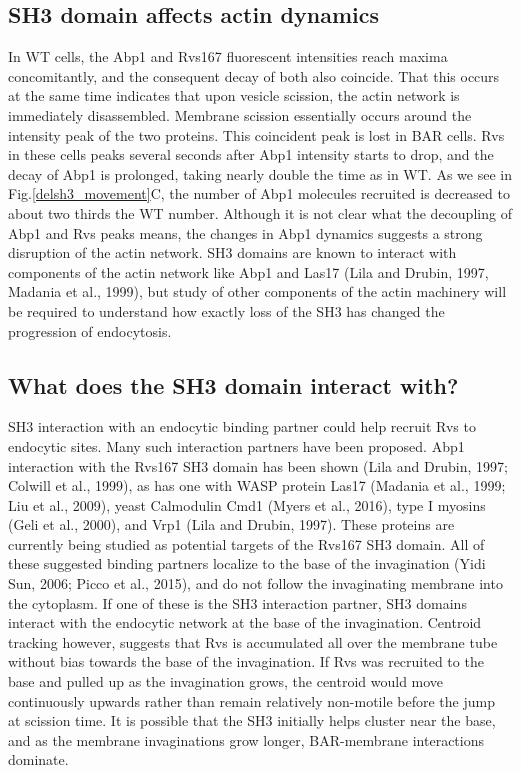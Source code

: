 \subsection{SH3 domain affects actin dynamics}
In WT cells, the Abp1 and Rvs167 fluorescent intensities reach maxima concomitantly, and the consequent decay of both also coincide. That this occurs at the same time indicates that upon vesicle scission, the actin network is immediately disassembled. Membrane scission essentially occurs around the intensity peak of the two proteins. This coincident peak is lost in BAR cells. Rvs in these cells peaks several seconds after Abp1 intensity starts to drop, and the decay of Abp1 is prolonged, taking nearly double the time as in WT. As we see in Fig.\ref{delsh3_movement}C, the number of Abp1 molecules recruited is decreased to about two thirds the WT number. Although it is not clear what the decoupling of Abp1 and Rvs peaks means, the changes in Abp1 dynamics suggests a strong disruption of the actin network. SH3 domains are known to interact with components of the actin network like Abp1 and Las17 (Lila and Drubin, 1997, Madania et al., 1999), but study of other components of the actin machinery will be required to understand how exactly loss of the SH3 has changed the progression of endocytosis.  


\subsection{What does the SH3 domain interact with?}
SH3 interaction with an endocytic binding partner could help recruit Rvs to endocytic sites. Many such interaction partners have been proposed. Abp1 interaction with the Rvs167 SH3 domain has been shown (Lila and Drubin, 1997; Colwill et al., 1999), as has one with WASP protein Las17 (Madania et al., 1999; Liu et al., 2009), yeast Calmodulin Cmd1 (Myers et al., 2016), type I myosins (Geli et al., 2000), and Vrp1 (Lila and Drubin, 1997). These proteins are currently being studied as potential targets of the Rvs167 SH3 domain. All of these suggested binding partners localize to the base of the invagination (Yidi Sun, 2006; Picco et al., 2015), and do not follow the invaginating membrane into the cytoplasm. If one of these is the SH3 interaction partner, SH3 domains interact with the endocytic network at the base of the invagination. Centroid tracking however, suggests that Rvs is accumulated all over the membrane tube without bias towards the base of the invagination. If Rvs was recruited to the base and pulled up as the invagination grows, the centroid would move continuously upwards rather than remain relatively non-motile before the jump at scission time. It is possible that the SH3 initially helps cluster near the base, and as the membrane invaginations grow longer, BAR-membrane interactions dominate. 





